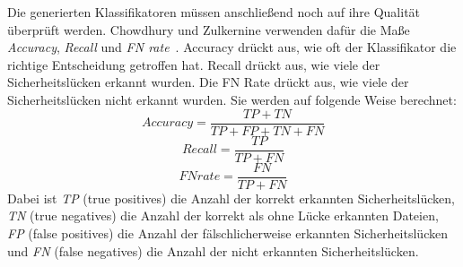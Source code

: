 Die generierten Klassifikatoren müssen anschließend noch auf ihre Qualität überprüft werden.
Chowdhury und Zulkernine verwenden dafür die Maße \emph{Accuracy}, \emph{Recall} und \emph{FN rate}~\cite{chowdhury_zulkernine_2009}.
Accuracy drückt aus, wie oft der Klassifikator die richtige Entscheidung getroffen hat.
Recall drückt aus, wie viele der Sicherheitslücken erkannt wurden.
Die FN Rate drückt aus, wie viele der Sicherheitslücken nicht erkannt wurden.
Sie werden auf folgende Weise berechnet:
\begin{equation}
	Accuracy = \frac{TP+TN}{TP+FP+TN+FN}
\end{equation}
\begin{equation}
	Recall = \frac{TP}{TP+FN}
\end{equation}
\begin{equation}
	FN rate = \frac{FN}{TP+FN}
\end{equation}
Dabei ist \emph{TP} (true positives) die Anzahl der korrekt erkannten Sicherheitslücken,
\emph{TN} (true negatives) die Anzahl der korrekt als ohne Lücke erkannten Dateien,
\emph{FP} (false positives) die Anzahl der fälschlicherweise erkannten Sicherheitslücken und
\emph{FN} (false negatives) die Anzahl der nicht erkannten Sicherheitslücken.
